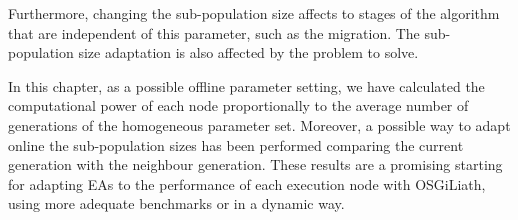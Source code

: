 Furthermore, changing the sub-population size affects to stages
of the algorithm that are independent of this parameter, such as
the migration. The sub-population size adaptation is also affected by the problem to solve.

In this chapter, as a possible offline parameter setting, we have calculated the computational power of each node proportionally 
to the average number of generations of the homogeneous parameter set. Moreover, a possible way to adapt 
online the sub-population sizes has been performed comparing the current generation with
 the neighbour generation. These results are a promising starting for adapting EAs to the
performance of each execution node with OSGiLiath, using more adequate benchmarks or in a dynamic way. 


